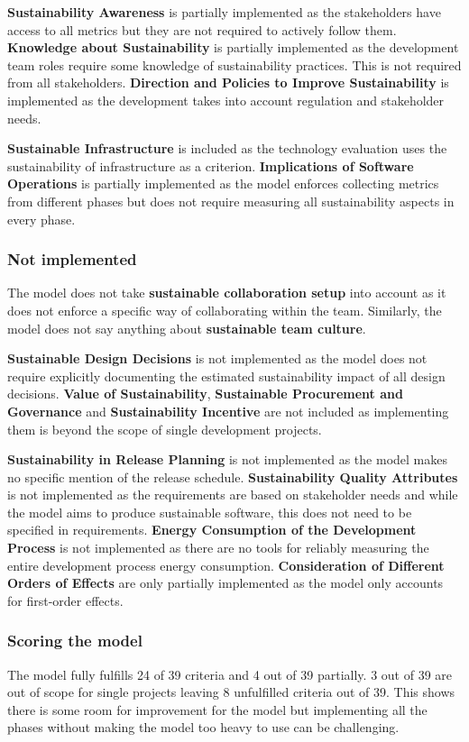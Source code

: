 \textbf{Sustainability Awareness} is partially implemented as the stakeholders have access to all metrics but they are not required to actively follow them. \textbf{Knowledge about Sustainability} is partially implemented as the development team roles require some knowledge of sustainability practices. This is not required from all stakeholders. \textbf{Direction and Policies to Improve Sustainability} is implemented as the development takes into account regulation and stakeholder needs.

\textbf{Sustainable Infrastructure} is included as the technology evaluation uses the sustainability of infrastructure as a criterion. \textbf{Implications of Software Operations} is partially implemented as the model enforces collecting metrics from different phases but does not require measuring all sustainability aspects in every phase.

\subsubsection{Not implemented}
The model does not take \textbf{sustainable collaboration setup} into account as it does not enforce a specific way of collaborating within the team. Similarly, the model does not say anything about \textbf{sustainable team culture}.

\textbf{Sustainable Design Decisions} is not implemented as the model does not require explicitly documenting the estimated sustainability impact of all design decisions. \textbf{Value of Sustainability}, \textbf{Sustainable Procurement and Governance} and \textbf{Sustainability Incentive} are not included as implementing them is beyond the scope of single development projects.

\textbf{Sustainability in Release Planning} is not implemented as the model makes no specific mention of the release schedule. \textbf{Sustainability Quality Attributes} is not implemented as the requirements are based on stakeholder needs and while the model aims to produce sustainable software, this does not need to be specified in requirements. \textbf{Energy Consumption of the Development Process} is not implemented as there are no tools for reliably measuring the entire development process energy consumption. \textbf{Consideration of Different Orders of Effects} are only partially implemented as the model only accounts for first-order effects.

\subsubsection{Scoring the model}
The model fully fulfills 24 of 39 criteria and 4 out of 39 partially. 3 out of 39 are out of scope for single projects leaving 8 unfulfilled criteria out of 39. This shows there is some room for improvement for the model but implementing all the phases without making the model too heavy to use can be challenging.

